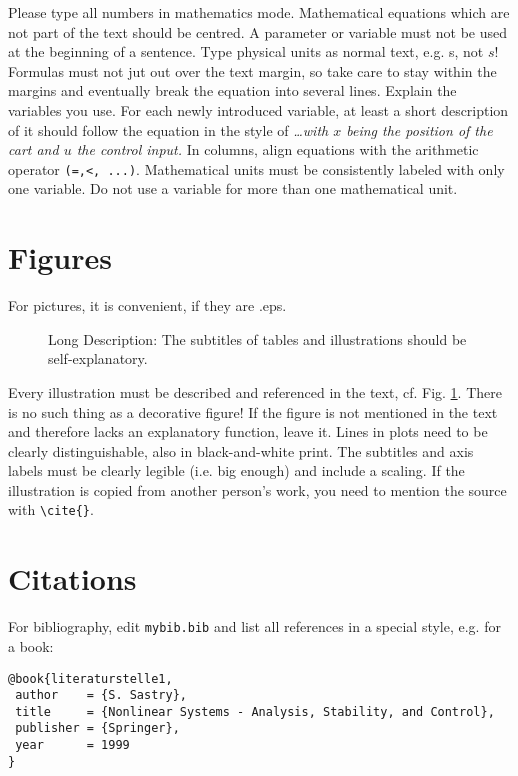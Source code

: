 \documentclass[a4paper,twoside, openright,12pt]{report}
\begin{document}
Please type all numbers in mathematics mode.
Mathematical equations which are not part of the text should be centred.
A parameter or variable must not be used at the beginning of a sentence.
Type physical units as normal text, e.g. s, not $s$!
Formulas must not jut out over the text margin, so take care to stay within the margins and eventually break the equation into several lines.
Explain the variables you use. For each newly introduced variable, at least a short description of it should follow the equation in the style of \emph{\ldots with $x$ being the position of the cart and $u$ the control input.}
In columns, align equations with the arithmetic operator \verb|(=,<, ...)|.
Mathematical units must be consistently labeled with only one variable. Do not
use a variable for more than one mathematical unit.

\section{Figures}

For pictures, it is convenient, if they are .eps.
\begin{figure}[htb]
\centering
\caption[Abbreviated Description]{Long Description: The subtitles of tables and illustrations should be self-explanatory.}
\label{FIG:abb1}
\end{figure}

Every illustration must be described and referenced in the text, cf. Fig. \ref{FIG:abb1}. 
There is no such thing as a decorative figure! 
If the figure is not mentioned in the text and therefore lacks an explanatory function, leave it.
Lines in plots need to be clearly distinguishable, also in black-and-white print. 
The subtitles and axis labels must be clearly legible (i.e. big enough) and include a scaling.
If the illustration is copied from another person's work, you need to mention the
source with \verb|\cite{}|.

\section{Citations}

For bibliography, edit {\tt mybib.bib} and list all
references in a special style, e.g. for a book: 
\begin{verbatim}
@book{literaturstelle1,
 author    = {S. Sastry},
 title     = {Nonlinear Systems - Analysis, Stability, and Control},
 publisher = {Springer},
 year      = 1999
}
\end{verbatim}
\end{document}
